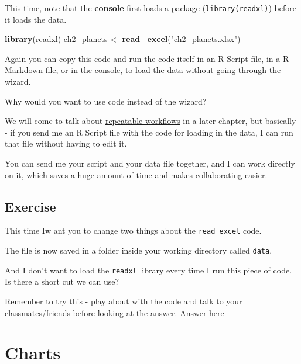 \documentclass[
]{book}
\newenvironment{Shaded}{\begin{snugshade}}{\end{snugshade}}
\newcommand{\KeywordTok}[1]{\textcolor[rgb]{0.13,0.29,0.53}{\textbf{#1}}}
\newcommand{\NormalTok}[1]{#1}
\newcommand{\StringTok}[1]{\textcolor[rgb]{0.31,0.60,0.02}{#1}}
\begin{document}
This time, note that the \textbf{console} first loads a package (\texttt{library(readxl)}) before it loads the data.

\begin{Shaded}
\begin{Highlighting}[]
\KeywordTok{library}\NormalTok{(readxl)}
\NormalTok{ch2_planets <-}\StringTok{ }\KeywordTok{read_excel}\NormalTok{(}\StringTok{"ch2_planets.xlsx"}\NormalTok{)}
\end{Highlighting}
\end{Shaded}

Again you can copy this code and run the code itself in an R Script file, in a R Markdown file, or in the console, to load the data without going through the wizard.

\begin{hey}
Why would you want to use code instead of the wizard?

We will come to talk about \protect\hyperlink{workflows}{repeatable
workflows} in a later chapter, but basically - if you send me an R
Script file with the code for loading in the data, I can run that file
without having to edit it.

You can send me your script and your data file together, and I can work
directly on it, which saves a huge amount of time and makes
collaborating easier.
\end{hey}

\hypertarget{ex_loadexcel}{%
\section{Exercise}\label{ex_loadexcel}}

This time Iw ant you to change two things about the \texttt{read\_excel} code.

The file is now saved in a folder inside your working directory called \texttt{data}.

And I don't want to load the \texttt{readxl} library every time I run this piece of code. Is there a short cut we can use?

Remember to try this - play about with the code and talk to your classmates/friends before looking at the answer. \protect\hyperlink{ans_loadexcel}{Answer here}

\hypertarget{charts}{%
\chapter{Charts}\label{charts}}
\end{document}
